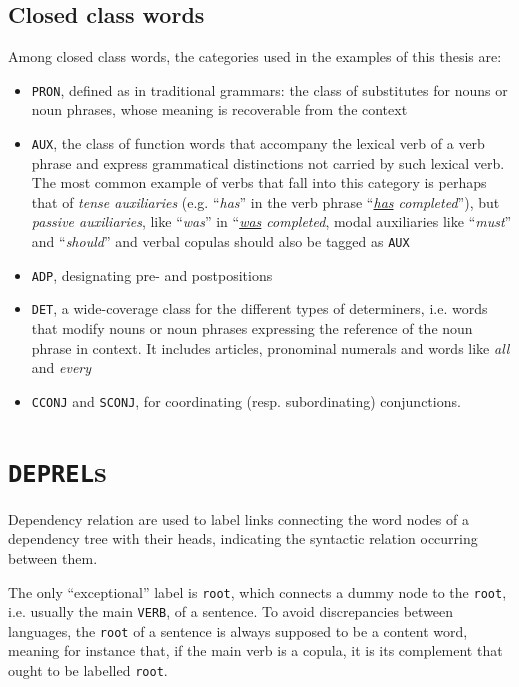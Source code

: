 \subsection{Closed class words} \label{cc}
Among closed class words, the categories used in the examples of this thesis are: \smallskip
\begin{itemize}
    \item \texttt{PRON}, defined as in traditional grammars: the class of substitutes for nouns or noun phrases, whose meaning is recoverable from the context
    \item \texttt{AUX}, the class of function words that accompany the lexical verb of a verb phrase and express grammatical distinctions not carried by such lexical verb. The most common example of verbs that fall into this category is perhaps that of \textit{tense auxiliaries} (e.g. ``\textit{has}'' in the verb phrase ``\textit{\underline{has} completed}''), but \textit{passive auxiliaries}, like ``\textit{was}'' in ``\textit{\underline{was} completed}, modal auxiliaries like ``\textit{must}'' and ``\textit{should}'' and verbal copulas should also be tagged as \texttt{AUX}
    \item \texttt{ADP}, designating pre- and postpositions
    \item \texttt{DET}, a wide-coverage class for the different types of determiners, i.e. words that modify nouns or noun phrases expressing the reference of the noun phrase in context. It includes articles, pronominal numerals and words like \textit{all} and \textit{every}
    \item \texttt{CCONJ} and \texttt{SCONJ}, for coordinating (resp. subordinating) conjunctions.
\end{itemize} \smallskip \smallskip

\section{\texttt{DEPREL}s} \label{a_lab}
Dependency relation are used to label links connecting the word nodes of a dependency tree with their heads, indicating the syntactic relation occurring between them. \smallskip

The only ``exceptional'' label is \texttt{root}, which connects a dummy node to the \texttt{root}, i.e. usually the main \texttt{VERB}, of a sentence. To avoid discrepancies between languages, the \texttt{root} of a sentence is always supposed to be a content word, meaning for instance that, if the main verb is a copula, it is its complement that ought to be labelled \texttt{root}.

